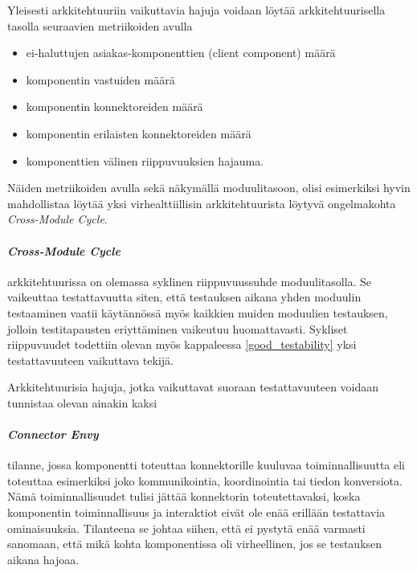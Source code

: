 \documentclass[finnish]{tktltiki2}
\numberwithin{table}{section}
\theoremstyle{definition}
\theoremstyle{remark}
\begin{document}
Yleisesti arkkitehtuuriin vaikuttavia hajuja voidaan löytää arkkitehtuurisella tasolla seuraavien metriikoiden avulla \citep{bertran_detecting_2011}

\begin{itemize}
	\item ei-haluttujen asiakas-komponenttien (client component) määrä
	\item komponentin vastuiden määrä
	\item komponentin konnektoreiden määrä
	\item komponentin erilaisten konnektoreiden määrä
	\item komponenttien välinen riippuvuuksien hajauma.
\end{itemize}


\noindent
Näiden metriikoiden avulla sekä näkymällä moduulitasoon, olisi esimerkiksi hyvin mahdollistaa löytää yksi virhealttiillisin arkkitehtuurista löytyvä ongelmakohta \citep[s. 57]{HotSpot} \textit{Cross-Module Cycle}.

\paragraph{\textit{Cross-Module Cycle}} arkkitehtuurissa on olemassa syklinen riippuvuussuhde moduulitasolla. Se vaikeuttaa testattavuutta siten, että testauksen aikana yhden moduulin testaaminen vaatii käytännössä myös kaikkien muiden moduulien testauksen, jolloin testitapausten eriyttäminen vaikeutuu huomattavasti. Sykliset riippuvuudet todettiin olevan myös kappaleessa \ref{good_testability} yksi testattavuuteen vaikuttava tekijä.

\newpage

Arkkitehtuurisia hajuja, jotka vaikuttavat suoraan testattavuuteen voidaan tunnistaa olevan ainakin kaksi \citep{garcia_identifying_2009}

\paragraph{\textit{Connector Envy}} tilanne, jossa komponentti toteuttaa konnektorille kuuluvaa toiminnallisuutta eli toteuttaa esimerkiksi joko kommunikointia, koordinointia tai tiedon konversiota. Nämä toiminnallisuudet tulisi jättää konnektorin toteutettavaksi, koska komponentin toiminnallisuus ja interaktiot eivät ole enää erillään testattavia ominaisuuksia. Tilanteena se johtaa siihen, että ei pystytä enää varmasti sanomaan, että mikä kohta komponentissa oli virheellinen, jos se testauksen aikana hajoaa.
\end{document}
